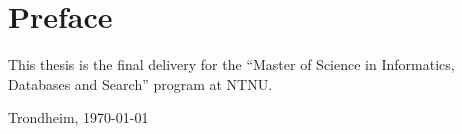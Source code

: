 \section*{Preface}
This thesis is the final delivery for the ``Master of Science in Informatics, Databases and Search'' program at NTNU.


\vfill

\hfill \thesisAuthor

\hfill Trondheim, \today
